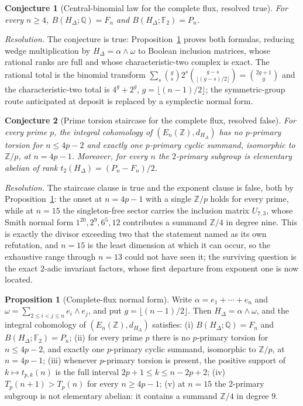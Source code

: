 \documentclass[11pt]{article}
\newtheorem{conjecture}{Conjecture}
\theoremstyle{definition}
\newcommand{\Z}{\mathbb Z}
\providecommand{\Z}{\mathbb Z}
\newtheorem{proposition}{Proposition}
\begin{document}
\begin{conjecture}[Central-binomial law for the complete flux, resolved true]\label{aa6}
For every $n\ge4$, $B(H_\Delta;\mathbb Q)=F_n$ and $B(H_\Delta;\mathbb F_2)=P_n$.
\end{conjecture}

\emph{Resolution.} The conjecture is true: Proposition~\ref{aa:flux} proves both formulas, reducing wedge multiplication by $H_\Delta=\alpha\wedge\omega$ to Boolean inclusion matrices, whose rational ranks are full and whose characteristic-two complex is exact.  The rational total is the binomial transform $\sum_s\binom gs2^{s}\binom{g-s}{\lfloor(g-s)/2\rfloor}=\binom{2g+1}g$ and the characteristic-two total is $4^{g}+2^{g}$, $g=\lfloor(n-1)/2\rfloor$; the symmetric-group route anticipated at deposit is replaced by a symplectic normal form.

\begin{conjecture}[Prime torsion staircase for the complete flux, resolved false]\label{aa7}
For every prime $p$, the integral cohomology of $(E_n(\Z),d_{H_\Delta})$ has no $p$-primary torsion for $n\le4p-2$ and exactly one $p$-primary cyclic summand, isomorphic to $\Z/p$, at $n=4p-1$.  Moreover, for every $n$ the $2$-primary subgroup is elementary abelian of rank $t_2(H_\Delta)=(P_n-F_n)/2$.
\end{conjecture}

\emph{Resolution.} The staircase clause is true and the exponent clause is false, both by Proposition~\ref{aa:flux}: the onset at $n=4p-1$ with a single $\Z/p$ holds for every prime, while at $n=15$ the singleton-free sector carries the inclusion matrix $U_{7,3}$, whose Smith normal form $1^{20},2^{9},6^{5},12$ contributes a summand $\Z/4$ in degree nine.  This is exactly the divisor exceeding two that the statement named as its own refutation, and $n=15$ is the least dimension at which it can occur, so the exhaustive range through $n=13$ could not have seen it; the surviving question is the exact $2$-adic invariant factors, whose first departure from exponent one is now located.

\begin{proposition}[Complete-flux normal form]\label{aa:flux}
Write $\alpha=e_1+\cdots+e_n$ and $\omega=\sum_{2\le i<j\le n}e_i\wedge e_j$, and put $g=\lfloor(n-1)/2\rfloor$.  Then $H_\Delta=\alpha\wedge\omega$, and the integral cohomology of $(E_n(\Z),d_{H_\Delta})$ satisfies:
(i) $B(H_\Delta;\mathbb Q)=F_n$ and $B(H_\Delta;\mathbb F_2)=P_n$;
(ii) for every prime $p$ there is no $p$-primary torsion for $n\le4p-2$, and exactly one $p$-primary cyclic summand, isomorphic to $\Z/p$, at $n=4p-1$;
(iii) whenever $p$-primary torsion is present, the positive support of $k\mapsto t_{p,k}(n)$ is the full interval $2p+1\le k\le n-2p+2$;
(iv) $T_p(n+1)>T_p(n)$ for every $n\ge4p-1$;
(v) at $n=15$ the $2$-primary subgroup is not elementary abelian: it contains a summand $\Z/4$ in degree $9$.
\end{proposition}
\end{document}
